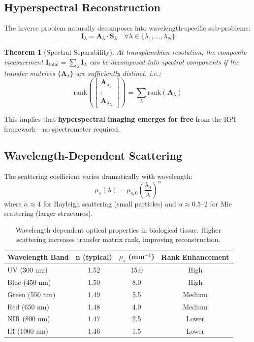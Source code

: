\documentclass[twocolumn,10pt,a4paper]{article}
\newtheorem{theorem}{Theorem}[section]
\begin{document}
\subsection{Hyperspectral Reconstruction}

The inverse problem naturally decomposes into wavelength-specific sub-problems:
\begin{equation}
\mathbf{I}_\lambda = \mathbf{A}_\lambda \cdot \mathbf{S}_\lambda \quad \forall \lambda \in \{\lambda_1, \ldots, \lambda_N\}
\end{equation}

\begin{theorem}[Spectral Separability]
At transplanckian resolution, the composite measurement $\mathbf{I}_{\text{total}} = \sum_\lambda \mathbf{I}_\lambda$ can be decomposed into spectral components if the transfer matrices $\{\mathbf{A}_\lambda\}$ are sufficiently distinct, i.e.:
\begin{equation}
\text{rank}\left( \begin{bmatrix} \mathbf{A}_{\lambda_1} \\ \vdots \\ \mathbf{A}_{\lambda_N} \end{bmatrix} \right) = \sum_\lambda \text{rank}(\mathbf{A}_\lambda)
\end{equation}
\end{theorem}

This implies that \textbf{hyperspectral imaging emerges for free} from the RPI framework---no spectrometer required.

\subsection{Wavelength-Dependent Scattering}

The scattering coefficient varies dramatically with wavelength:
\begin{equation}
\mu_s(\lambda) = \mu_{s,0} \left( \frac{\lambda_0}{\lambda} \right)^\alpha
\end{equation}
where $\alpha \approx 4$ for Rayleigh scattering (small particles) and $\alpha \approx 0.5$--$2$ for Mie scattering (larger structures).

\begin{table}[h]
\centering
\begin{tabular}{lccc}
\toprule
\textbf{Wavelength Band} & \textbf{n (typical)} & \textbf{$\mu_s$ (mm$^{-1}$)} & \textbf{Rank Enhancement} \\
\midrule
UV (300 nm) & 1.52 & 15.0 & High \\
Blue (450 nm) & 1.50 & 8.0 & High \\
Green (550 nm) & 1.49 & 5.5 & Medium \\
Red (650 nm) & 1.48 & 4.0 & Medium \\
NIR (800 nm) & 1.47 & 2.5 & Lower \\
IR (1000 nm) & 1.46 & 1.5 & Lower \\
\bottomrule
\end{tabular}
\caption{Wavelength-dependent optical properties in biological tissue. Higher scattering increases transfer matrix rank, improving reconstruction.}
\end{table}
\end{document}
